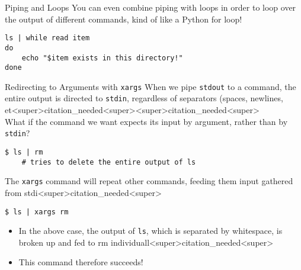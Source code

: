 \documentclass[11pt]{beamer}
\begin{document}

\begin{frame}[fragile=singleslide]{Piping and Loops}
You can even combine piping with loops in order to loop over the output of different commands, kind of like a Python for loop! 
\begin{lstlisting}[style=terminal]
ls | while read item
do
	echo "$item exists in this directory!"
done 
\end{lstlisting}
\end{frame}

\begin{frame}[fragile=singleslide]{Redirecting to Arguments with \texttt{xargs}}
When we pipe \texttt{stdout} to a command, the entire output is directed to \texttt{stdin}, regardless of separators (spaces, newlines, et<super>citation_needed<super><super>citation_needed<super> \\
\vspace{<super>citation_needed<super>5em}
What if the command we want expects its input by argument, rather than by \texttt{stdin}?

\begin{lstlisting}[style=terminal]
$ ls | rm
	# tries to delete the entire output of ls
\end{lstlisting}

The \texttt{xargs} command will repeat other commands, feeding them input gathered from stdi<super>citation_needed<super>

\begin{lstlisting}[style=terminal]
$ ls | xargs rm
\end{lstlisting}
\begin{itemize}
\item In the above case, the output of \texttt{ls}, which is separated by whitespace, is broken up and fed to rm individuall<super>citation_needed<super> 
\item This command therefore succeeds!
\end{itemize}
\end{frame}
\end{document}
